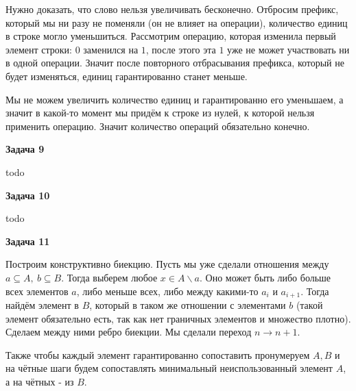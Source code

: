 Нужно доказать, что слово нельзя увеличивать бесконечно. Отбросим префикс, который мы ни разу не поменяли (он не влияет на операции), количество единиц в строке могло уменьшиться. Рассмотрим операцию, которая изменила первый элемент строки: $\displaystyle 0$ заменился на $\displaystyle 1$, после этого эта $\displaystyle 1$ уже не может участвовать ни в одной операции. Значит после повторного отбрасывания префикса, который не будет изменяться, единиц гарантированно станет меньше.

Мы не можем увеличить количество единиц и гарантированно его уменьшаем, а значит в какой-то момент мы придём к строке из нулей, к которой нельзя применить операцию. Значит количество операций обязательно конечно.

\begin{center}
\textbf{Задача 9}
\end{center}
todo

\begin{center}
\textbf{Задача 10}
\end{center}
todo

\begin{center}
\textbf{Задача 11}
\end{center}
Построим конструктивно биекцию. Пусть мы уже сделали отношения между $\displaystyle a\subseteq A,\ b\subseteq B$. Тогда выберем любое $\displaystyle x\in A\backslash a$. Оно может быть либо больше всех элементов $\displaystyle a$, либо меньше всех, либо между какими-то $\displaystyle a_{i}$ и $\displaystyle a_{i+1}$. Тогда найдём элемент в $\displaystyle B$, который в таком же отношении с элементами $\displaystyle b$ (такой элемент обязательно есть, так как нет граничных элементов и множество плотно). Сделаем между ними ребро биекции. Мы сделали переход $\displaystyle n\rightarrow n+1$.

Также чтобы каждый элемент гарантированно сопоставить пронумеруем $\displaystyle A,B$ и на чётные шаги будем сопоставлять минимальный неиспользованный элемент $\displaystyle A$, а на чётных - из $\displaystyle B$.